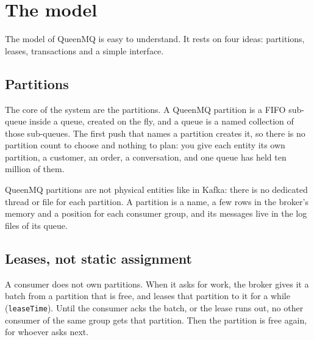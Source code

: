 
\section{The model}

The model of QueenMQ is easy to understand. It rests on four ideas: partitions, leases,
transactions and a simple interface.

\subsection{Partitions}

The core of the system are the partitions. A QueenMQ partition is a FIFO sub-queue inside a queue,
created on the fly, and a queue is a named collection of those sub-queues. The first push that
names a partition creates it, so there is no partition count to choose and nothing to plan: you
give each entity its own partition, a customer, an order, a conversation, and one queue has held
ten million of them.


QueenMQ partitions are not physical entities like in Kafka: there is no dedicated thread or file
for each partition. A partition is a name, a few rows in the broker's memory and a position for
each consumer group, and its messages live in the log files of its queue.


\subsection{Leases, not static assignment}

A consumer does not own partitions. When it asks for work, the broker gives it a batch from a
partition that is free, and leases that partition to it for a while (\texttt{leaseTime}). Until
the consumer acks the batch, or the lease runs out, no other consumer of the same group gets that
partition. Then the partition is free again, for whoever asks next.

